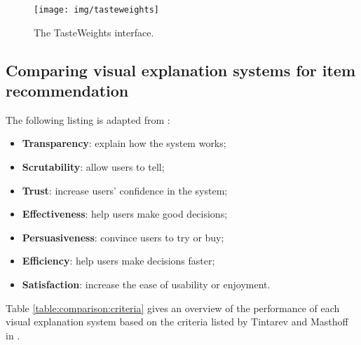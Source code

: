 \begin{figure}%
	\begin{center}
		\texttt{[image: img/tasteweights]}%
	\end{center}
	\caption{The TasteWeights interface.}%
	\label{figure:tasteweights}%
\end{figure}








\subsection{Comparing visual explanation systems for item recommendation}



The following listing is adapted from \cite{tintarev:2007:SER:1547550.1547664}:

\begin{itemize}
	\item \textbf{Transparency}: explain how the system works;
	\item \textbf{Scrutability}: allow users to tell;
	\item \textbf{Trust}: increase users' confidence in the system;
	\item \textbf{Effectiveness}: help users make good decisions;
	\item \textbf{Persuasiveness}: convince users to try or buy;
	\item \textbf{Efficiency}: help users make decisions faster;
	\item \textbf{Satisfaction}: increase the ease of usability or enjoyment.
\end{itemize}

Table \ref{table:comparison:criteria} gives an overview of the performance of each visual explanation system based on the criteria listed by Tintarev and Masthoff in \cite{tintarev:2007:SER:1547550.1547664}.

